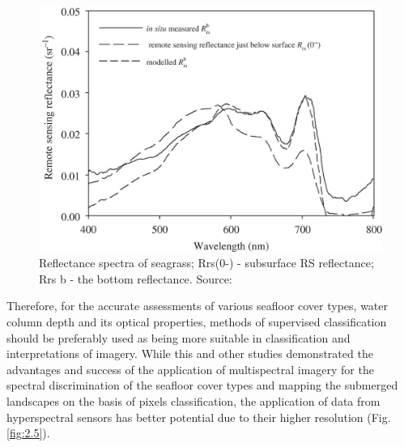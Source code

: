 \documentclass[10pt, a4paper]{article}
\begin{document}
\begin{figure}
	\centering
	\includegraphics[scale=0.15]{Fig-15.jpg}
	\caption{Reflectance spectra of seagrass; Rrs(0-) - subsurface RS reflectance; Rrs b - the bottom
		reflectance. Source:\cite{Yang10}\label{Yang10}}
	\label{fig:2.6}
\end{figure}

Therefore, for the accurate assessments of various seafloor cover types, water
column depth and its optical properties, methods of supervised classification should be preferably
used as being more suitable in classification and interpretations of imagery.
While this and other studies \cite{Phinn08}\label{Phinn08}demonstrated the advantages and success of the
application of multispectral imagery for the spectral discrimination of the seafloor cover types and
mapping the submerged landscapes on the basis of pixels classification, the application of data from
hyperspectral sensors has better potential due to their higher resolution (Fig.\ref{fig:2.5}).
\end{document}
